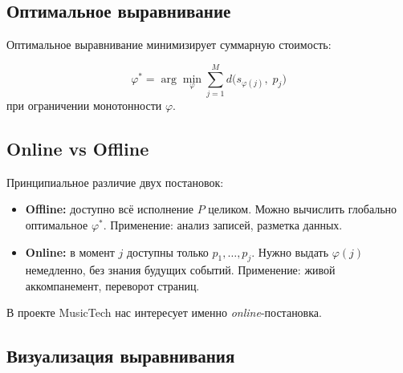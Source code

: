 \documentclass[a4paper,11pt]{article}
\begin{document}
\subsection{Оптимальное выравнивание}

Оптимальное выравнивание минимизирует суммарную стоимость:

\begin{formulabox}[title={Оптимальное выравнивание}]
\[
  \varphi^* = \arg\min_{\varphi} \sum_{j=1}^{M} d\bigl(s_{\varphi(j)},\; p_j\bigr)
\]
при ограничении монотонности $\varphi$.
\end{formulabox}

\subsection{Online vs Offline}

Принципиальное различие двух постановок:

\begin{itemize}[leftmargin=2em]
  \item \textbf{Offline:} доступно всё исполнение $P$ целиком.
        Можно вычислить глобально оптимальное $\varphi^*$.
        Применение: анализ записей, разметка данных.
  \item \textbf{Online:} в момент $j$ доступны только $p_1, \ldots, p_j$.
        Нужно выдать $\varphi(j)$ немедленно, без знания будущих событий.
        Применение: живой аккомпанемент, переворот страниц.
\end{itemize}

В проекте MusicTech нас интересует именно \emph{online}-постановка.

\subsection{Визуализация выравнивания}
\end{document}
